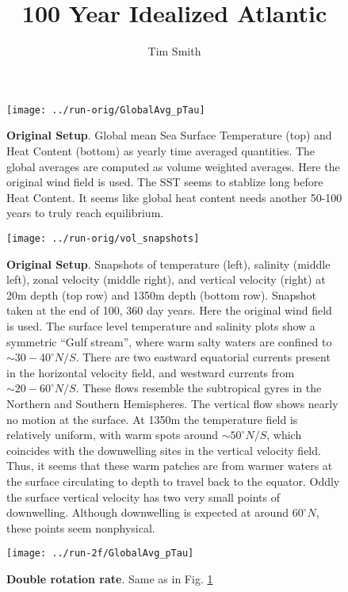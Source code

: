 \documentclass[a4paper,11pt]{article}
\title{\vspace{-10ex}100 Year Idealized Atlantic}
\author{Tim Smith}
\date{\vspace{-3ex}}
\begin{document}
 



\begin{figure}
\centering
\texttt{[image: ../run-orig/GlobalAvg\_pTau]}
\caption{\textbf{Original Setup}. Global mean Sea Surface Temperature (top) and Heat Content (bottom) as yearly time averaged quantities. The global averages are computed as volume weighted averages. Here the original wind field is used. The SST seems to stablize long before Heat Content. It seems like global heat content needs another 50-100 years to truly reach equilibrium. }
\label{fig:globalAvgs}
\end{figure}

\begin{figure}
\centering
\texttt{[image: ../run-orig/vol\_snapshots]}
\caption{\textbf{Original Setup}. Snapshots of temperature (left), salinity (middle left), zonal velocity (middle right), and vertical velocity (right) at 20m depth (top row) and 1350m depth (bottom row). Snapshot taken at the end of 100, 360 day years. Here the original wind field is used. The surface level temperature and salinity plots show a symmetric ``Gulf stream'', where warm salty waters are confined to $\sim 30-40^{\circ}N/S$. There are two eastward equatorial currents present in the horizontal velocity field, and westward currents from $\sim20-60^{\circ}N/S$. These flows resemble the subtropical gyres in the Northern and Southern Hemispheres. The vertical flow shows nearly no motion at the surface. At 1350m the temperature field is relatively uniform, with warm spots around $\sim50^{\circ}N/S$, which coincides with the downwelling sites in the vertical velocity field. Thus, it seems that these warm patches are from warmer waters at the surface circulating to depth to travel back to the equator. Oddly the surface vertical velocity has two very small points of downwelling. Although downwelling is expected at around $60^{\circ}N$, these points seem nonphysical.}
\label{fig:volSnaps}
\end{figure}


\begin{figure}
\centering
\texttt{[image: ../run-2f/GlobalAvg\_pTau]}
\caption{\textbf{Double rotation rate}. Same as in Fig. \ref{fig:globalAvgs}}
\label{fig:2f_globalAvgs}
\end{figure}
\end{document}
